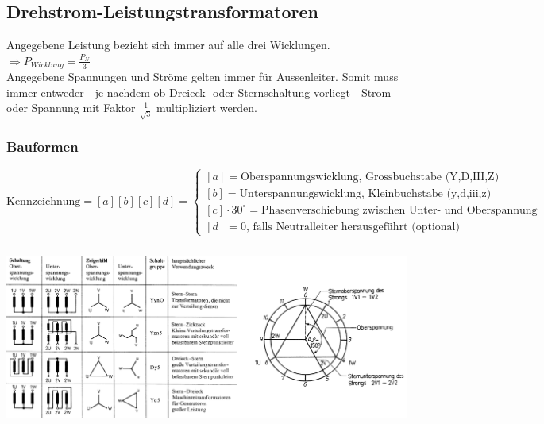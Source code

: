 	\subsection{Drehstrom-Leistungstransformatoren} 
	Angegebene Leistung bezieht sich immer auf alle drei Wicklungen. $\Rightarrow P_{Wicklung} =
	\frac{P_N}{3}$ \\
	Angegebene Spannungen und Str\"ome gelten immer für Aussenleiter. Somit muss immer entweder - je
 nachdem ob Dreieck- oder Sternschaltung vorliegt -	Strom oder Spannung mit Faktor
 $\frac{1}{\sqrt{3}}$ multipliziert werden.
 	\subsubsection{Bauformen}
	 $$\text{Kennzeichnung} = [a][b][c][d] = \begin{cases}
                  [a] = \text{Oberspannungswicklung, Grossbuchstabe (Y,D,III,Z)
                  }\\
                  [b] = \text{Unterspannungswicklung, Kleinbuchstabe (y,d,iii,z) } \\
                  [c] \cdot 30^\circ = \text{Phasenverschiebung zwischen Unter- und Oberspannung }
                  \\ [d] = 0 \text{, falls Neutralleiter herausgeführt (optional)}
                  \end{cases}$$
		\begin{center}
	    	\includegraphics[height=6cm]{bilder/Drehstromtrafo.png}
	    \end{center} 
